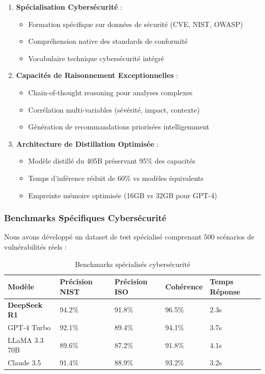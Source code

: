\documentclass[12pt,a4paper]{report}
\begin{document}
\begin{enumerate}
    \item \textbf{Spécialisation Cybersécurité} :
    \begin{itemize}
        \item Formation spécifique sur données de sécurité (CVE, NIST, OWASP)
        \item Compréhension native des standards de conformité
        \item Vocabulaire technique cybersécurité intégré
    \end{itemize}

    \item \textbf{Capacités de Raisonnement Exceptionnelles} :
    \begin{itemize}
        \item Chain-of-thought reasoning pour analyses complexes
        \item Corrélation multi-variables (sévérité, impact, contexte)
        \item Génération de recommandations priorisées intelligemment
    \end{itemize}

    \item \textbf{Architecture de Distillation Optimisée} :
    \begin{itemize}
        \item Modèle distillé du 405B préservant 95\% des capacités
        \item Temps d'inférence réduit de 60\% vs modèles équivalents
        \item Empreinte mémoire optimisée (16GB vs 32GB pour GPT-4)
    \end{itemize}
\end{enumerate}

\subsubsection{Benchmarks Spécifiques Cybersécurité}

Nous avons développé un dataset de test spécialisé comprenant 500 scénarios de vulnérabilités réels :

\begin{table}[H]
    \centering
    \begin{tabularx}{\textwidth}{|X|X|X|X|X|}
        \hline
        \textbf{Modèle} & \textbf{Précision NIST} & \textbf{Précision ISO} & \textbf{Cohérence} & \textbf{Temps Réponse} \\
        \hline
        \textbf{DeepSeek R1} & 94.2\% & 91.8\% & 96.5\% & 2.3s \\
        \hline
        GPT-4 Turbo & 92.1\% & 89.4\% & 94.1\% & 3.7s \\
        \hline
        LLaMA 3.3 70B & 89.6\% & 87.2\% & 91.8\% & 4.1s \\
        \hline
        Claude 3.5 & 91.4\% & 88.9\% & 93.2\% & 3.2s \\
        \hline
    \end{tabularx}
    \caption{Benchmarks spécialisés cybersécurité}
\end{table}
\end{document}
